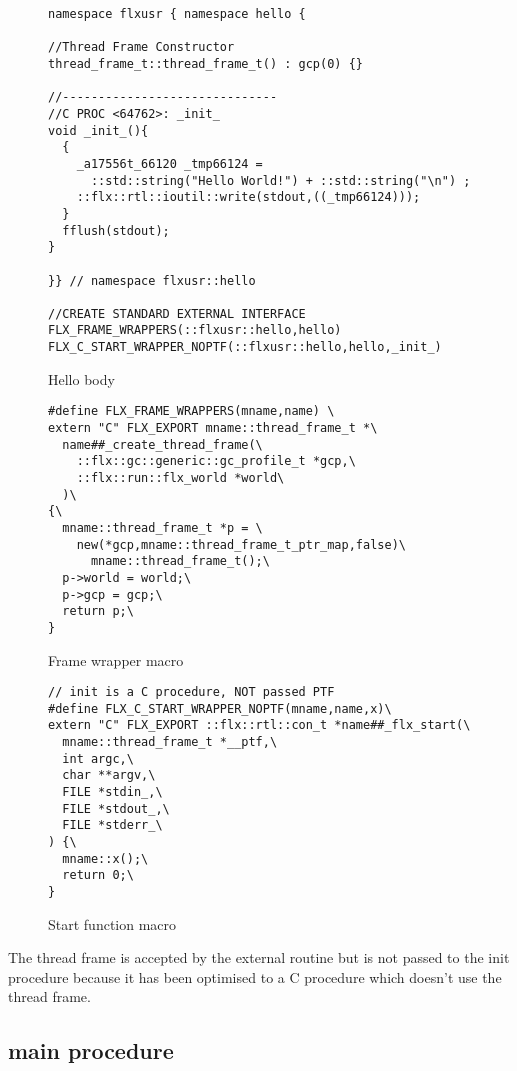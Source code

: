 \documentclass[oneside]{book}
\begin{document}
\begin{figure}[p]
\caption{Hello body\label{Hello body}}
\begin{verbatim}
namespace flxusr { namespace hello {

//Thread Frame Constructor
thread_frame_t::thread_frame_t() : gcp(0) {}

//------------------------------
//C PROC <64762>: _init_
void _init_(){
  {
    _a17556t_66120 _tmp66124 = 
      ::std::string("Hello World!") + ::std::string("\n") ;
    ::flx::rtl::ioutil::write(stdout,((_tmp66124)));
  }
  fflush(stdout);
}

}} // namespace flxusr::hello

//CREATE STANDARD EXTERNAL INTERFACE
FLX_FRAME_WRAPPERS(::flxusr::hello,hello)
FLX_C_START_WRAPPER_NOPTF(::flxusr::hello,hello,_init_)

\end{verbatim}
\end{figure}
\begin{figure}[p]
\caption{Frame wrapper macro\label{frame wrapper macro}}
\begin{verbatim}
#define FLX_FRAME_WRAPPERS(mname,name) \
extern "C" FLX_EXPORT mname::thread_frame_t *\
  name##_create_thread_frame(\
    ::flx::gc::generic::gc_profile_t *gcp,\
    ::flx::run::flx_world *world\
  )\
{\
  mname::thread_frame_t *p = \
    new(*gcp,mname::thread_frame_t_ptr_map,false)\
      mname::thread_frame_t();\
  p->world = world;\
  p->gcp = gcp;\
  return p;\
}
\end{verbatim}
\end{figure}

\begin{figure}[p]
\caption{Start function macro\label{start function macro}}
\begin{verbatim}
// init is a C procedure, NOT passed PTF
#define FLX_C_START_WRAPPER_NOPTF(mname,name,x)\
extern "C" FLX_EXPORT ::flx::rtl::con_t *name##_flx_start(\
  mname::thread_frame_t *__ptf,\
  int argc,\
  char **argv,\
  FILE *stdin_,\
  FILE *stdout_,\
  FILE *stderr_\
) {\
  mname::x();\
  return 0;\
}
\end{verbatim}
\end{figure}

The thread frame is accepted by the
external routine but is not passed to the init procedure because it
has been optimised to a C procedure which doesn't use the thread frame.


\subsection{main procedure}
\end{document}
